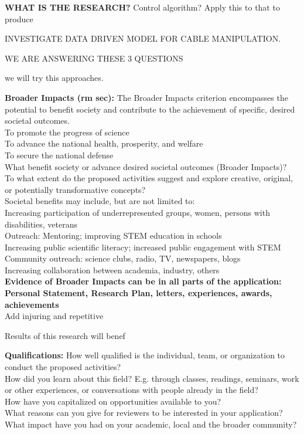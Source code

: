 \documentclass[12pt]{article}
\begin{document}
\noindent
\textbf{WHAT IS THE RESEARCH?}
Control algorithm?
Apply this to that to produce

INVESTIGATE DATA DRIVEN MODEL FOR CABLE MANIPULATION.

WE ARE ANSWERING THESE 3 QUESTIONS

we will try this approaches.




\noindent
\textbf{Broader Impacts (rm sec):} The Broader Impacts criterion encompasses the potential to benefit society and contribute to the achievement of specific, desired societal outcomes.\\
To promote the progress of science\\
To advance the national health, prosperity, and welfare\\
To secure the national defense\\
What benefit society or advance desired societal outcomes (Broader Impacts)?\\
To what extent do the proposed activities suggest and explore creative, original, or potentially transformative concepts?\\
Societal benefits may include, but are not limited to:\\
Increasing participation of underrepresented groups, women, persons with disabilities, veterans\\
Outreach: Mentoring; improving STEM education in schools\\
Increasing public scientific literacy; increased public engagement with STEM\\
Community outreach: science clubs, radio, TV, newspapers, blogs\\
Increasing collaboration between academia, industry, others\\
\noindent
\textbf{Evidence of Broader Impacts can be in all parts of the application: Personal Statement, Research Plan, letters, experiences, awards, achievements}\\

\noindent
Add injuring and repetitive

\noindent
Results of this research will benef


\noindent
\textbf{Qualifications:} How well qualified is the individual, team, or organization to conduct the proposed activities? \\
How did you learn about this field? E.g. through classes, readings, seminars, work or other experiences, or conversations with people already in the field?\\
How have you capitalized on opportunities available to you?\\
What reasons can you give for reviewers to be interested in your application?\\
What impact have you had on your academic, local and the broader community?\\
\end{document}
